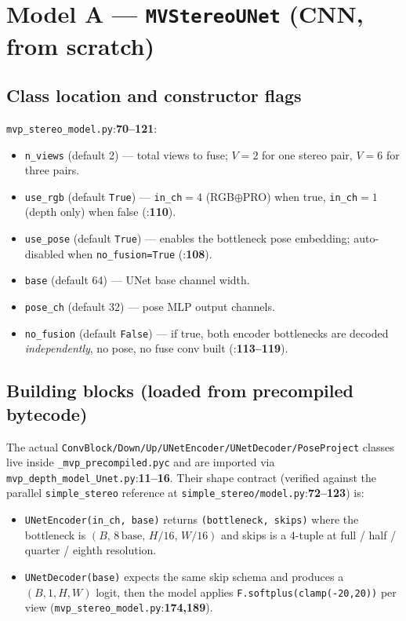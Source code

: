 \documentclass[11pt]{article}
\newcommand{\fref}[2]{\texttt{\textcolor{filegray}{#1}}:\textbf{#2}}
\begin{document}
\section{Model A --- \texttt{MVStereoUNet} (CNN, from scratch)}

\subsection{Class location and constructor flags}
\fref{mvp\_stereo\_model.py}{70--121}:
\begin{itemize}[leftmargin=2em]
  \item \texttt{n\_views} (default 2) --- total views to fuse;
        $V=2$ for one stereo pair, $V=6$ for three pairs.
  \item \texttt{use\_rgb} (default \texttt{True}) ---
        \texttt{in\_ch}$=4$ (RGB$\oplus$PRO) when true,
        \texttt{in\_ch}$=1$ (depth only) when false
        (\fref{}{110}).
  \item \texttt{use\_pose} (default \texttt{True}) --- enables the
        bottleneck pose embedding; auto-disabled when
        \texttt{no\_fusion=True}
        (\fref{}{108}).
  \item \texttt{base} (default 64) --- UNet base channel width.
  \item \texttt{pose\_ch} (default 32) --- pose MLP output channels.
  \item \texttt{no\_fusion} (default \texttt{False}) --- if true, both
        encoder bottlenecks are decoded \emph{independently}, no pose,
        no fuse conv built
        (\fref{}{113--119}).
\end{itemize}

\subsection{Building blocks (loaded from precompiled bytecode)}
The actual \texttt{ConvBlock/Down/Up/UNetEncoder/UNetDecoder/PoseProject}
classes live inside \texttt{\_mvp\_precompiled.pyc} and are imported via
\fref{mvp\_depth\_model\_Unet.py}{11--16}. Their shape contract (verified
against the parallel \texttt{simple\_stereo} reference at
\fref{simple\_stereo/model.py}{72--123}) is:

\begin{itemize}[leftmargin=2em]
  \item \texttt{UNetEncoder(in\_ch, base)} returns
        \texttt{(bottleneck, skips)} where the bottleneck is
        $(B,\,8\,\text{base},\,H/16,\,W/16)$ and skips is a 4-tuple at
        full / half / quarter / eighth resolution.
  \item \texttt{UNetDecoder(base)} expects the same skip schema and
        produces a $(B,1,H,W)$ logit, then the model applies
        \texttt{F.softplus(clamp(-20,20))} per view
        (\fref{mvp\_stereo\_model.py}{174,189}).
\end{itemize}
\end{document}
